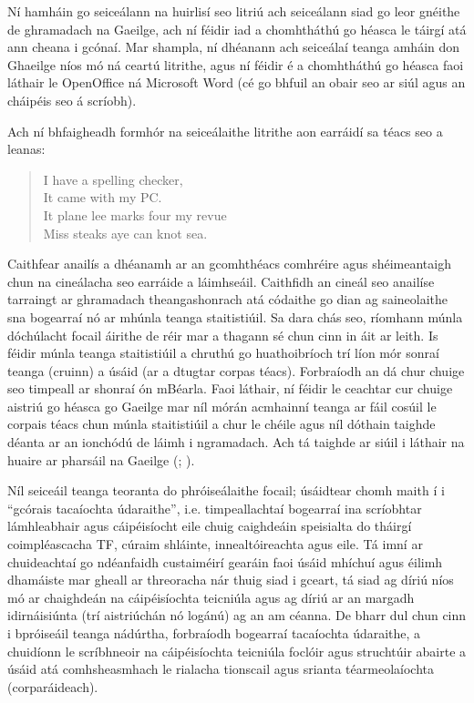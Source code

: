 \begin{multicols}{2}
Ní hamháin go seiceálann na huirlisí seo litriú ach seiceálann siad go leor gnéithe de ghramadach na Gaeilge, ach ní féidir iad a chomhtháthú go héasca le táirgí atá ann cheana i gcónaí. Mar shampla, ní dhéanann ach seiceálaí teanga amháin don Ghaeilge \cite{gramadoir} níos mó ná ceartú litrithe, agus ní féidir é a chomhtháthú go héasca faoi láthair le OpenOffice ná Microsoft Word (cé go bhfuil an obair seo ar siúl agus an cháipéis seo á scríobh).  

Ach ní bhfaigheadh formhór na seiceálaithe litrithe aon earráidí sa téacs seo \cite{zar1} a leanas: 

\begin{quote}
  I have a spelling checker,\\
  It came with my PC.\\
  It plane lee marks four my revue\\
  Miss steaks aye can knot sea.
\end{quote}

Caithfear anailís a dhéanamh ar an gcomhthéacs comhréire agus shéimeantaigh chun na cineálacha seo earráide a láimhseáil. Caithfidh an cineál seo anailíse tarraingt ar ghramadach theangashonrach atá códaithe go dian ag saineolaithe sna bogearraí nó ar mhúnla teanga staitistiúil. Sa dara chás seo, ríomhann múnla dóchúlacht focail áirithe de réir mar a thagann sé chun cinn in áit ar leith. Is féidir múnla teanga staitistiúil a chruthú go huathoibríoch trí líon mór sonraí teanga (cruinn) a úsáid (ar a dtugtar corpas téacs). Forbraíodh an dá chur chuige seo timpeall ar shonraí ón mBéarla. Faoi láthair, ní féidir le ceachtar cur chuige aistriú go héasca go Gaeilge mar níl mórán acmhainní teanga ar fáil cosúil le corpais téacs chun múnla staitistiúil a chur le chéile agus níl dóthain taighde déanta ar an ionchódú de láimh i ngramadach. Ach tá taighde ar siúil i láthair na huaire ar pharsáil na Gaeilge (\cite{lynn2012}; \cite{elaine2010}).

Níl seiceáil teanga teoranta do phróiseálaithe focail; úsáidtear chomh maith í i ``gcórais tacaíochta údaraithe'', i.e. timpeallachtaí bogearraí ina scríobhtar lámhleabhair agus cáipéisíocht eile chuig caighdeáin speisialta do tháirgí coimpléascacha TF, cúraim shláinte, innealtóireachta agus eile. Tá imní ar chuideachtaí go ndéanfaidh custaiméirí gearáin faoi úsáid mhíchuí agus éilimh dhamáiste mar gheall ar threoracha nár thuig siad i gceart, tá siad ag díriú níos mó ar chaighdeán na cáipéisíochta teicniúla agus ag díriú ar an margadh idirnáisiúnta (trí aistriúchán nó logánú) ag an am céanna. De bharr dul chun cinn i bpróiseáil teanga nádúrtha, forbraíodh bogearraí tacaíochta údaraithe, a chuidíonn le scríbhneoir na cáipéisíochta teicniúla foclóir agus struchtúir abairte a úsáid atá comhsheasmhach le rialacha tionscail agus srianta téarmeolaíochta (corparáideach).


\end{multicols}

